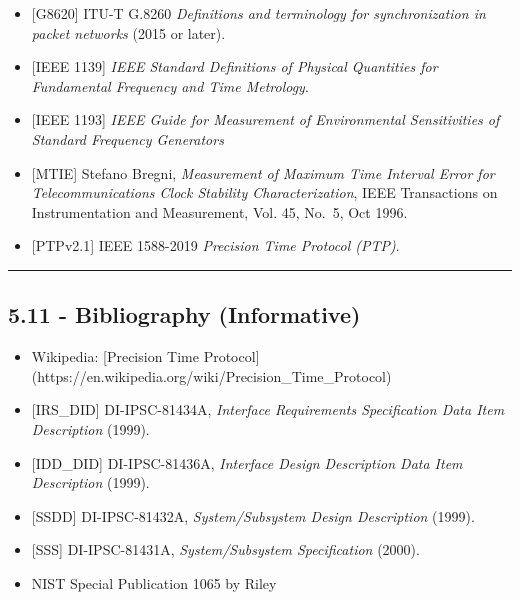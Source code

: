 \documentclass[
]{article}
\begin{document}
\begin{itemize}
\item
  {{[}}G8620{{]}} ITU-T G.8260 \emph{Definitions and terminology for
  synchronization in packet networks} (2015 or later).\\
\item
  {{[}}IEEE 1139{{]}} \emph{IEEE Standard Definitions of Physical
  Quantities for Fundamental Frequency and Time Metrology}.
\item
  {{[}}IEEE 1193{{]}} \emph{IEEE Guide for Measurement of Environmental
  Sensitivities of Standard Frequency Generators}
\item
  {{[}}MTIE{{]}} Stefano Bregni, \emph{Measurement of Maximum Time
  Interval Error for Telecommunications Clock Stability
  Characterization}, IEEE Transactions on Instrumentation and
  Measurement, Vol. 45, No.~5, Oct 1996.\\
\item
  {{[}}PTPv2.1{{]}} IEEE 1588-2019 \emph{Precision Time Protocol (PTP)}.
\end{itemize}

\begin{center}\rule{0.5\linewidth}{0.5pt}\end{center}

\subsection{5.11 - Bibliography
(Informative)}\label{bibliography-informative}

\begin{itemize}
\item
  Wikipedia: {{[}}Precision Time Protocol{{]}}
  (https://en.wikipedia.org/wiki/Precision\_Time\_Protocol)\\
\item
  {{[}}IRS\_DID{{]}} DI-IPSC-81434A, \emph{Interface Requirements
  Specification Data Item Description} (1999).\\
\item
  {{[}}IDD\_DID{{]}} DI-IPSC-81436A, \emph{Interface Design Description
  Data Item Description} (1999).\\
\item
  {{[}}SSDD{{]}} DI-IPSC-81432A, \emph{System/Subsystem Design
  Description} (1999).\\
\item
  {{[}}SSS{{]}} DI-IPSC-81431A, \emph{System/Subsystem Specification}
  (2000).
\item
  NIST Special Publication 1065 by Riley
\end{itemize}
\end{document}
